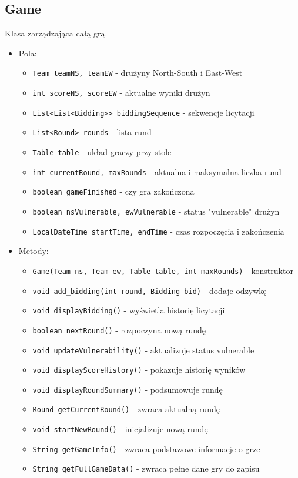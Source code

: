 \documentclass{article}
\begin{document}
\subsection{Game}
Klasa zarządzająca całą grą.

\begin{itemize}
    \item Pola:
    \begin{itemize}
        \item \texttt{Team teamNS, teamEW} - drużyny North-South i East-West
        \item \texttt{int scoreNS, scoreEW} - aktualne wyniki drużyn
        \item \texttt{List<List<Bidding>> biddingSequence} - sekwencje licytacji
        \item \texttt{List<Round> rounds} - lista rund
        \item \texttt{Table table} - układ graczy przy stole
        \item \texttt{int currentRound, maxRounds} - aktualna i maksymalna liczba rund
        \item \texttt{boolean gameFinished} - czy gra zakończona
        \item \texttt{boolean nsVulnerable, ewVulnerable} - status "vulnerable" drużyn
        \item \texttt{LocalDateTime startTime, endTime} - czas rozpoczęcia i zakończenia
    \end{itemize}
    
    \item Metody:
    \begin{itemize}
        \item \texttt{Game(Team ns, Team ew, Table table, int maxRounds)} - konstruktor
        \item \texttt{void add\_bidding(int round, Bidding bid)} - dodaje odzywkę
        \item \texttt{void displayBidding()} - wyświetla historię licytacji
        \item \texttt{boolean nextRound()} - rozpoczyna nową rundę
        \item \texttt{void updateVulnerability()} - aktualizuje status vulnerable
        \item \texttt{void displayScoreHistory()} - pokazuje historię wyników
        \item \texttt{void displayRoundSummary()} - podsumowuje rundę
        \item \texttt{Round getCurrentRound()} - zwraca aktualną rundę
        \item \texttt{void startNewRound()} - inicjalizuje nową rundę
        \item \texttt{String getGameInfo()} - zwraca podstawowe informacje o grze
        \item \texttt{String getFullGameData()} - zwraca pełne dane gry do zapisu
    \end{itemize}
\end{itemize}
\end{document}
